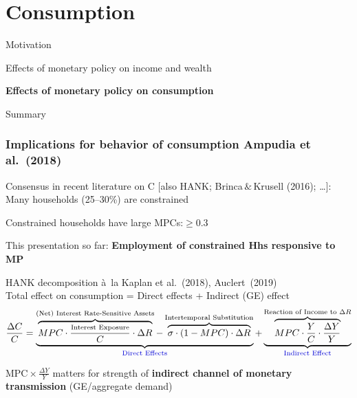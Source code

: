 \documentclass[pdflatex,aspectratio=169]{beamer}
\newcommand{\jemph}[1]{{\color{StataDarkBlue}#1}}
\newcommand{\jbemph}[1]{\textbf{\color{SlideNavy}#1}}
\begin{document}
\section{Consumption}
\begin{frame}
\bi\setlength{\itemsep}{3mm}
\item Motivation
\item Effects of monetary policy on income and wealth
\item \jbemph{Effects of monetary policy on consumption}
\item Summary
\ei
\end{frame}



\begin{frame}\frametitle{\bf Implications for behavior of consumption \hspace*{\fill} \footnotesize{Ampudia et al.\ (2018)} }


\bi\setlength{\itemsep}{2mm}
\item {Consensus in recent literature on C $[$also HANK; Brinca$\,\&\,$Krusell (2016); \dots$]$:}\\
Many households (25--30\%) are \jemph{constrained}
\pause
\item Constrained households have \jemph{large MPCs:${}\ge0.3$}
\pause
\item This presentation so far: \jbemph{Employment of constrained Hhs responsive to MP}
\pause
\item  HANK decomposition \`a\ la Kaplan et al.~(2018), Auclert~(2019)\\[1mm]
Total effect on consumption = Direct effects + Indirect (GE) effect
{\small
$$
\frac{\Delta C}{C}=\underbrace{\overbrace{MPC\cdot\frac{\text{\scriptsize{Interest Exposure}}}{C}\cdot\Delta R}^{\text{(Net) Interest Rate-Sensitive Assets}}-\overbrace{\sigma\cdot(1-MPC)\cdot\Delta R}^{\text{Intertemporal Substitution}}}_{\text{\jemph{Direct Effects}}}+\underbrace{\overbrace{MPC\cdot\frac{Y}{C}\cdot\frac{\Delta Y}{Y}}^{\text{Reaction of Income to $\Delta R$}}}_{\text{\jemph{Indirect Effect}}}
$$
}
\pause
 \item \jemph{MPC${}\times\frac{\Delta Y}{Y}$ matters for strength of \jbemph{indirect channel of monetary transmission} (GE/aggregate demand) }\\
\ei


\end{frame}
\end{document}
